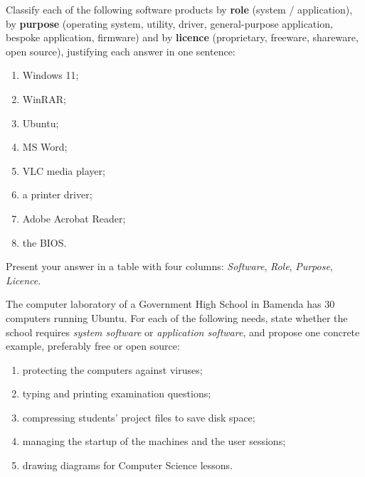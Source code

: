 \documentclass[11pt]{article}
\begin{document}
\begin{exercice}
Classify each of the following software products by \textbf{role} (system / application), by \textbf{purpose} (operating system, utility, driver, general-purpose application, bespoke application, firmware) and by \textbf{licence} (proprietary, freeware, shareware, open source), justifying each answer in one sentence:
\begin{enumerate}
\item Windows 11;
\item WinRAR;
\item Ubuntu;
\item MS Word;
\item VLC media player;
\item a printer driver;
\item Adobe Acrobat Reader;
\item the BIOS.
\end{enumerate}
Present your answer in a table with four columns: \emph{Software}, \emph{Role}, \emph{Purpose}, \emph{Licence}.
\end{exercice}

\begin{exercice}
The computer laboratory of a Government High School in Bamenda has 30 computers running Ubuntu. For each of the following needs, state whether the school requires \emph{system software} or \emph{application software}, and propose one concrete example, preferably free or open source:
\begin{enumerate}
\item protecting the computers against viruses;
\item typing and printing examination questions;
\item compressing students' project files to save disk space;
\item managing the startup of the machines and the user sessions;
\item drawing diagrams for Computer Science lessons.
\end{enumerate}
\end{exercice}
\end{document}
